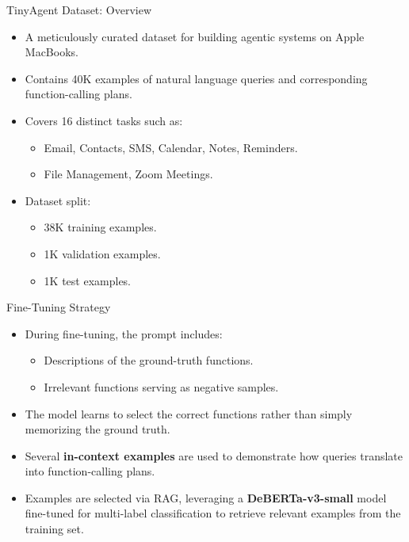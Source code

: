 \documentclass{beamer}
\begin{document}
\begin{frame}{TinyAgent Dataset: Overview}
    \begin{itemize}
        \item A meticulously curated dataset for building agentic systems on Apple MacBooks.
        \item Contains 40K examples of natural language queries and corresponding function-calling plans.
        \item Covers 16 distinct tasks such as:
        \begin{itemize}
            \item Email, Contacts, SMS, Calendar, Notes, Reminders.
            \item File Management, Zoom Meetings.
        \end{itemize}
        \item Dataset split:
        \begin{itemize}
            \item 38K training examples.
            \item 1K validation examples.
            \item 1K test examples.
        \end{itemize}
    \end{itemize}
\end{frame}

\begin{frame}{Fine-Tuning Strategy}
    \begin{itemize}
        \item During fine-tuning, the prompt includes:
        \begin{itemize}
            \item Descriptions of the ground-truth functions.
            \item Irrelevant functions serving as negative samples.
        \end{itemize}
        \item The model learns to select the correct functions rather than simply memorizing the ground truth.
        \item Several \textbf{in-context examples} are used to demonstrate how queries translate into function-calling plans.
        \item Examples are selected via RAG, leveraging a \textbf{DeBERTa-v3-small} model \citep{he2021debertav3} fine-tuned for multi-label classification to retrieve relevant examples from the training set.
    \end{itemize}
\end{frame}
\end{document}
